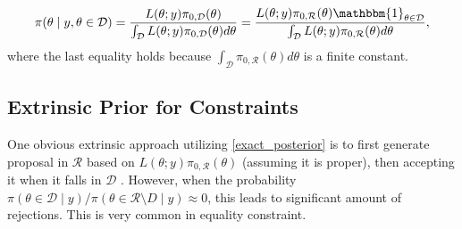 \documentclass[10pt]{article}
\newcommand{\mc}[1]{\mathcal{#1}}
\begin{document}
\begin{equation}
\begin{aligned}
\label{exact_posterior}
\pi(\theta \mid y, \theta \in \mc D) = \frac{ L(\theta;y)\pi_{0,\mc D}(\theta)}{\int_{\mc D} L(\theta;y)\pi_{0,\mc D}(\theta) d\theta } = \frac{ L(\theta;y)\pi_{0,\mc R}(\theta) \mathbbm{1}_{\theta\in \mc D} }{\int_{\mc D} L(\theta;y)\pi_{0,\mc R}(\theta) d\theta },
\end{aligned}
\end{equation}
where the last equality holds because $\int_{\mc D}  \pi_{0,\mc R}(\theta) d\theta$ is a finite constant.




\subsection{Extrinsic Prior for Constraints}

One obvious extrinsic approach utilizing \eqref{exact_posterior} is to first generate proposal in $\mc R$ based on $L(\theta;y)\pi_{0,\mc R}(\theta)$ (assuming it is proper), then accepting it when it falls in $\mc D$ \citep{gelfand1992bayesian}. However, when the probability $\pi(\theta\in \mc D \mid y) / \pi(\theta\in \mc R \setminus D \mid y) \approx 0$, this leads to significant amount of rejections. This is very common in equality constraint.
\end{document}
